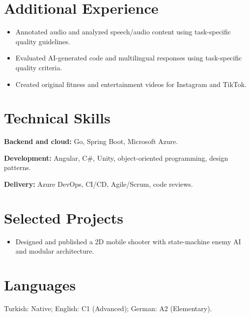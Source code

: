 \documentclass[10pt,a4paper]{article}
\begin{document}
\section{Additional Experience}
\begin{itemize}
  \item Annotated audio and analyzed speech/audio content using task-specific quality guidelines.
\end{itemize}
\begin{itemize}
  \item Evaluated AI-generated code and multilingual responses using task-specific quality criteria.
\end{itemize}
\begin{itemize}
  \item Created original fitness and entertainment videos for Instagram and TikTok.
\end{itemize}

\section{Technical Skills}
\textbf{Backend and cloud:} Go, Spring Boot, Microsoft Azure.\par
\textbf{Development:} Angular, C\#, Unity, object-oriented programming, design patterns.\par
\textbf{Delivery:} Azure DevOps, CI/CD, Agile/Scrum, code reviews.

\section{Selected Projects}
\begin{itemize}
  \item Designed and published a 2D mobile shooter with state-machine enemy AI and modular architecture.
\end{itemize}

\section{Languages}
Turkish: Native; English: C1 (Advanced); German: A2 (Elementary).
\end{document}
